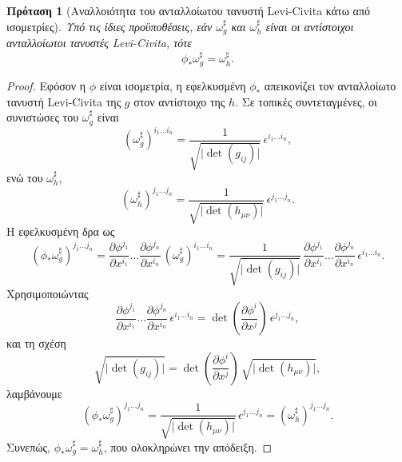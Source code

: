 \documentclass[11pt,a4paper,twoside,openright]{book}
\newtheorem{proposition}[lemma]{Πρόταση}
\begin{document}
\begin{proposition}[Αναλλοιότητα του ανταλλοίωτου τανυστή Levi-Civita κάτω από ισομετρίες]
	\label{prop:invariance-contravariant-levi-civita-isometries}
Υπό τις ίδιες προϋποθέσεις, εάν $\omega_g^\sharp$ και $\omega_h^\sharp$ είναι οι αντίστοιχοι ανταλλοίωτοι τανυστές Levi-Civita, τότε
\begin{equation}
\phi_* \omega_g^\sharp = \omega_h^\sharp.
\end{equation}
\end{proposition}

\begin{proof}
Εφόσον η $\phi$ είναι ισομετρία, η εφελκυσμένη $\phi_*$ απεικονίζει τον ανταλλοίωτο τανυστή Levi-Civita της $g$ στον αντίστοιχο της $h$. Σε τοπικές συντεταγμένες, οι συνιστώσες του $\omega_g^\sharp$ είναι
\begin{equation*}
(\omega_g^\sharp)^{i_1 \dots i_n}
=
\frac{1}{\sqrt{\lvert \det(g_{ij}) \rvert}}
\,
\epsilon^{i_1 \dots i_n},
\end{equation*}
ενώ του $\omega_h^\sharp$,
\begin{equation*}
(\omega_h^\sharp)^{j_1 \dots j_n}
=
\frac{1}{\sqrt{\lvert \det(h_{\mu\nu}) \rvert}}
\,
\epsilon^{j_1 \dots j_n}.
\end{equation*}
Η εφελκυσμένη δρα ως
\begin{equation*}
(\phi_* \omega_g^\sharp)^{j_1 \dots j_n}
=
\frac{\partial \phi^{j_1}}{\partial x^{i_1}}
\dots
\frac{\partial \phi^{j_n}}{\partial x^{i_n}}
\,
(\omega_g^\sharp)^{i_1 \dots i_n}
=
\frac{1}{\sqrt{\lvert \det(g_{ij}) \rvert}}
\,
\frac{\partial \phi^{j_1}}{\partial x^{i_1}}
\dots
\frac{\partial \phi^{j_n}}{\partial x^{i_n}}
\,
\epsilon^{i_1 \dots i_n}.
\end{equation*}
Χρησιμοποιώντας
\begin{equation*}
\frac{\partial \phi^{j_1}}{\partial x^{i_1}}
\dots
\frac{\partial \phi^{j_n}}{\partial x^{i_n}}
\,
\epsilon^{i_1 \dots i_n}
=
\det\left( \frac{\partial \phi^i}{\partial x^j} \right)
\,
\epsilon^{j_1 \dots j_n},
\end{equation*}
και τη σχέση
\begin{equation*}
\sqrt{\lvert \det(g_{ij}) \rvert}
=
\det\left( \frac{\partial \phi^i}{\partial x^j} \right)
\,
\sqrt{\lvert \det(h_{\mu\nu}) \rvert},
\end{equation*}
λαμβάνουμε
\begin{equation*}
(\phi_* \omega_g^\sharp)^{j_1 \dots j_n}
=
\frac{1}{\sqrt{\lvert \det(h_{\mu\nu}) \rvert}}
\,
\epsilon^{j_1 \dots j_n}
=
(\omega_h^\sharp)^{j_1 \dots j_n}.
\end{equation*}
Συνεπώς, $\phi_* \omega_g^\sharp = \omega_h^\sharp$, που ολοκληρώνει την απόδειξη.
\end{proof}
\end{document}
